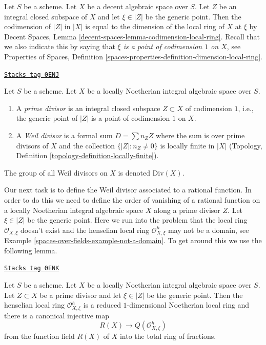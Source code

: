 Let $S$ be a scheme. Let $X$ be a decent algebraic space over $S$.
Let $Z$ be an integral closed subspace of $X$ and let
$\xi \in |Z|$ be the generic point. Then the codimension of
$|Z|$ in $|X|$ is equal to the dimension of the local ring
of $X$ at $\xi$ by
Decent Spaces, Lemma \ref{decent-spaces-lemma-codimension-local-ring}.
Recall that we also indicate this by saying that
{\it $\xi$ is a point of codimension $1$ on $X$}, see
Properties of Spaces, Definition
\ref{spaces-properties-definition-dimension-local-ring}.

\begin{definition}
\label{spaces-over-fields-definition-Weil-divisor}
\href{https://stacks.math.columbia.edu/tag/0ENJ}{\texttt{Stacks tag 0ENJ}}

Let $S$ be a scheme.
Let $X$ be a locally Noetherian integral algebraic space over $S$.
\begin{enumerate}
\item A {\it prime divisor} is an integral closed subspace $Z \subset X$
of codimension $1$, i.e., the generic point of $|Z|$ is a point
of codimension $1$ on $X$.
\item A {\it Weil divisor} is a formal sum $D = \sum n_Z Z$ where
the sum is over prime divisors of $X$ and the collection
$\{|Z| : n_Z \not = 0\}$ is locally finite in $|X|$
(Topology, Definition \ref{topology-definition-locally-finite}).
\end{enumerate}
The group of all Weil divisors on $X$ is denoted $\text{Div}(X)$.
\end{definition}

Our next task is to define the Weil divisor associated to a rational
function. In order to do this we need to define the order of vanishing of a
rational function on a locally Noetherian integral algebraic space $X$
along a prime divisor $Z$. Let $\xi \in |Z|$ be the generic point.
Here we run into the problem that the local ring $\mathcal{O}_{X, \xi}$
doesn't exist and the henselian local ring $\mathcal{O}_{X, \xi}^h$
may not be a domain, see Example \ref{spaces-over-fields-example-not-a-domain}.
To get around this we use the following lemma.

\begin{lemma}
\label{spaces-over-fields-lemma-order-vanishing}
\href{https://stacks.math.columbia.edu/tag/0ENK}{\texttt{Stacks tag 0ENK}}

Let $S$ be a scheme. Let $X$ be a locally Noetherian integral algebraic space
over $S$. Let $Z \subset X$ be a prime divisor and let $\xi \in |Z|$ be
the generic point. Then the henselian local ring $\mathcal{O}_{X, \xi}^h$
is a reduced $1$-dimensional Noetherian local ring and
there is a canonical injective map
$$
R(X) \longrightarrow Q(\mathcal{O}_{X, \xi}^h)
$$
from the function field $R(X)$ of $X$ into the total ring of fractions.
\end{lemma}

